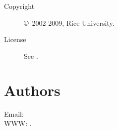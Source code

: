 \documentclass[english]{article}
\begin{document}
\begin{description}
\item[Copyright] \copyright\ 2002-2009, Rice University.
\item[License] See .
\end{description}

\section{Authors}

Email:  \\
WWW: .

\LatexManEnd
\end{document}
